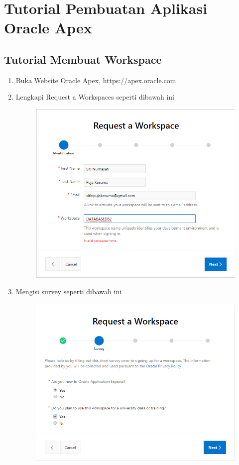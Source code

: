 \chapter*{Tutorial Pembuatan Aplikasi Oracle Apex}
\section*{Tutorial Membuat Workspace}

\begin{enumerate}
	\item Buka Website Oracle Apex,  https://apex.oracle.com

	\item Lengkapi Request a Workspaces seperti dibawah ini 
	\begin{figure} [!htbp]
	\includegraphics[scale=0.2]{Apex/3.png}
	\centering
	\end{figure}

	\item Mengisi survey seperti dibawah ini 
	\begin{figure} [!htbp]
	\includegraphics[scale=0.2]{Apex/4.png}
	\centering
	\end{figure}
	

\end{enumerate}
